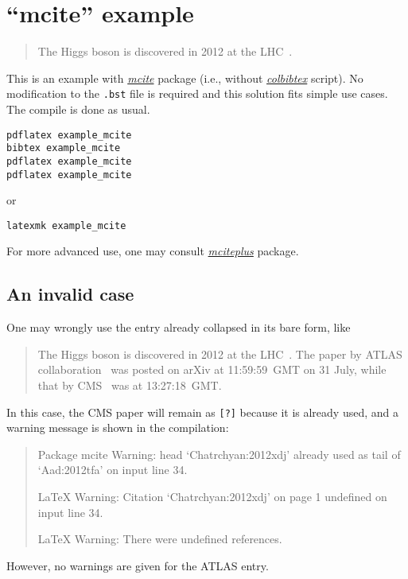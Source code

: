 \documentclass{article}
\begin{document}
\section*{``mcite'' example}
\begin{quote}
The Higgs boson is discovered in 2012 at the LHC~\cite{Aad:2012tfa,*Chatrchyan:2012xdj}.
\end{quote}

This is an example with \href{https://ctan.org/pkg/mcite}{\emph{mcite}} package (i.e., without \href{https://github.com/misho104/colbibtex}{\emph{colbibtex}} script).
No modification to the \texttt{.bst} file is required and this solution fits simple use cases.
The compile is done as usual.
\begin{lstlisting}
pdflatex example_mcite
bibtex example_mcite
pdflatex example_mcite
pdflatex example_mcite
\end{lstlisting}
or
\begin{lstlisting}
latexmk example_mcite
\end{lstlisting}

For more advanced use, one may consult \href{https://ctan.org/pkg/mciteplus}{\emph{mciteplus}} package.

\subsection*{An invalid case}
One may wrongly use the entry already collapsed in its bare form, like
\begin{quote}
The Higgs boson is discovered in 2012 at the LHC~\cite{Aad:2012tfa,*Chatrchyan:2012xdj}.
The paper by ATLAS collaboration~\cite{Aad:2012tfa} was posted on arXiv at 11:59:59~GMT on 31 July, while that by CMS~\cite{Chatrchyan:2012xdj} was at 13:27:18~GMT.
\end{quote}
In this case, the CMS paper will remain as \texttt{[?]} because it is already used, and a warning message is shown in the compilation:
\begin{quote}
Package mcite Warning: head `Chatrchyan:2012xdj' already used as tail of `Aad:2012tfa' on input line 34.

LaTeX Warning: Citation `Chatrchyan:2012xdj' on page 1 undefined on input line 34.

LaTeX Warning: There were undefined references.
\end{quote}
However, no warnings are given for the ATLAS entry.


\end{document}
